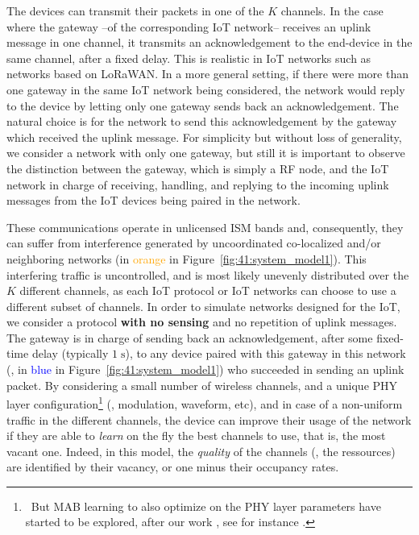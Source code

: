 The devices can transmit their packets in one of the $K$ channels. In the case where the gateway --of the corresponding IoT network-- receives an uplink message in one channel, it transmits an acknowledgement to the end-device in the same channel, after a fixed delay.
This is realistic in IoT networks such as networks based on LoRaWAN.
In a more general setting, if there were more than one gateway in the same IoT network being considered, the network would reply to the device by letting only one gateway sends back an acknowledgement.
The natural choice is for the network to send this acknowledgement by the gateway which received the uplink message.
For simplicity but without loss of generality, we consider a network with only one gateway,
but still it is important to observe the distinction between the gateway, which is simply a RF node, and the IoT network in charge of receiving, handling, and replying to the incoming uplink messages from the IoT devices being paired in the network.
%

These communications operate in unlicensed ISM bands and, consequently, they can suffer from interference generated by uncoordinated co-localized and/or neighboring networks (in \textcolor{orange}{orange} in Figure~\ref{fig:41:system_model1}).
This interfering traffic is uncontrolled, and is most likely unevenly distributed over the $K$ different channels,
as each IoT protocol or IoT networks can choose to use a different subset of channels.
%
In order to simulate networks designed for the IoT, we consider a protocol \textbf{with no sensing} and no repetition of uplink messages. The gateway is in charge of sending back an acknowledgement, after some fixed-time delay (typically $1\;\mathrm{s}$), to any device paired with this gateway in this network (\ie, in \textcolor{blue}{blue} in Figure~\ref{fig:41:system_model1}) who succeeded in sending an uplink packet.
%
By considering a small number of wireless channels, and a unique PHY layer configuration\footnote{~But MAB learning to also optimize on the PHY layer parameters have started to be explored, after our work \cite{Bonnefoi17}, see for instance \cite{KerkoucheAlami18}.} (\ie, modulation, waveform, etc), and in case of a non-uniform traffic in the different channels,
the device can improve their usage of the network if they are able to \emph{learn} on the fly the best channels to use, that is, the most vacant one. Indeed, in this model, the \emph{quality} of the channels (\ie, the ressources) are identified by their vacancy, or one minus their occupancy rates.


